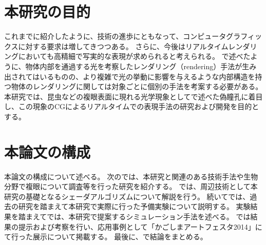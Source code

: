 

\section{本研究の目的}
\label{SObjective}

これまでに紹介したように、技術の進歩にともなって、コンピュータグラフィックスに対する要求は増してきつつある。
さらに、今後はリアルタイムレンダリングにおいても高精細で写実的な表現が求められると考えられる。
で述べたように、物体内部を通過する光を考察したレンダリング（rendering）手法が生み出されてはいるものの、より複雑で光の挙動に影響を与えるような内部構造を持つ物体のレンダリングに関しては対象ごとに個別の手法を考案する必要がある。
本研究では、昆虫などの複眼表面に現れる光学現象としてで述べた偽瞳孔に着目し、この現象のCGによるリアルタイムでの表現手法の研究および開発を目的とする。

\section{本論文の構成}
\label{SPaper_structure}

本論文の構成について述べる。
次のでは、本研究と関連のある技術手法や生物分野で複眼について調査等を行った研究を紹介する。
では、周辺技術として本研究の基礎となるシェーダアルゴリズムについて解説を行う。
続いてでは、過去の研究を踏まえて本研究で実際に行った予備実験について説明する。
実験結果を踏まえてでは、本研究で提案するシミュレーション手法を述べる。
では結果の提示および考察を行い、応用事例として「かごしまアートフェスタ2014」にて行った展示について掲載する。
最後に、で結論をまとめる。


